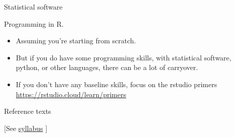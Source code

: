 \documentclass[xcolor={dvipsnames}, handout]{beamer}
\begin{document}

\begin{frame}{Statistical software}

Programming in R.\pause
\begin{itemize}
\item Assuming you're starting from scratch. \pause
\item But if you do have some programming skills, with statistical software, python, or other languages, there can be a lot of carryover. \pause
\item If you don't have any baseline skills, focus on the rstudio primers \url{https://rstudio.cloud/learn/primers}
\end{itemize}

\end{frame}



\begin{frame}{Reference texts}

\begin{center}
{[}See \href{https://docs.google.com/document/d/1wiQwd5HgVohVTC46dfHo67dQ2KBJjNmdO2Pyv5e2Q_s/edit?usp=sharing}{syllabus} {]}
\end{center}

\end{frame}



\end{document}
